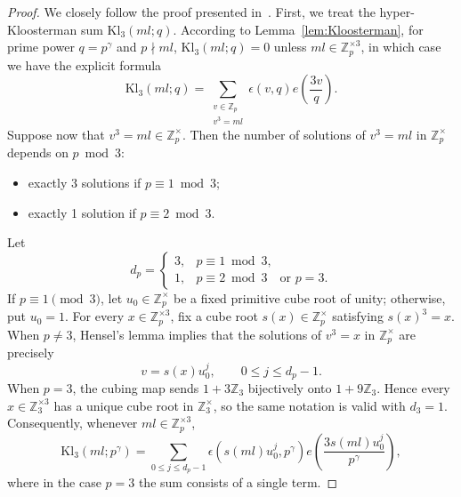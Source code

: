 \documentclass[11pt,reqno]{amsart}
\numberwithin{equation}{section}
\theoremstyle{plain}
\theoremstyle{definition}
\newcommand{\Kl}{\mathrm{Kl}}
\begin{document}
\begin{proof}
We closely follow the proof presented in~\cite[Theorem 6]{MD}.
First, we treat the hyper-Kloosterman sum $\Kl_3(ml;q)$. According to Lemma~\ref{lem:Kloosterman},
for prime power $q = p^\gamma$ and $p \nmid ml$, $\Kl_3(ml;q)=0$ unless $ml\in \mathbb{Z}_p^{\times 3}$, in which case we have the explicit formula
\[
\Kl_3(ml;q) = \sum_{\substack{v \in \mathbb{Z}_p \\ v^3 = ml}} \epsilon(v,q) e\left(\frac{3v}{q}\right).
\]
Suppose now that $v^3=ml \in \mathbb{Z}_p^{\times}$. Then the number of solutions of $v^3=ml$ in $\mathbb{Z}_p^\times$ depends on $p\bmod3$:
\begin{itemize}
\item[-]
exactly 3 solutions if $p\equiv 1 \bmod 3$;
\vskip 2mm
\item[-]
exactly 1 solution if $p\equiv 2 \bmod 3$.
\end{itemize}
Let
$$
d_p=
\begin{cases}
3, & p\equiv1\bmod3,\\
1, & p\equiv2\bmod3\quad \text{or}\,\, p=3.
\end{cases}
$$
If \(p\equiv1\pmod3\), let \(u_0\in\mathbb Z_p^\times\) be a fixed
primitive cube root of unity; otherwise, put \(u_0=1\).
For every \(x\in\mathbb Z_p^{\times3}\), fix a cube root
\(s(x)\in\mathbb Z_p^\times\) satisfying $s(x)^3=x.$
When \(p\neq3\), Hensel's lemma implies that the solutions of
\(v^3=x\) in \(\mathbb Z_p^\times\) are precisely
$$
v=s(x)u_0^j,\qquad 0\le j\le d_p-1.
$$
When \(p=3\), the cubing map sends \(1+3\mathbb Z_3\) bijectively
onto \(1+9\mathbb Z_3\). Hence every
\(x\in\mathbb Z_3^{\times3}\) has a unique cube root in
\(\mathbb Z_3^\times\), so the same notation is valid with \(d_3=1\).
Consequently, whenever \(ml\in\mathbb Z_p^{\times3}\),
$$
\Kl_3(ml;p^\gamma)=\sum_{0\le j\le d_p-1}
\epsilon\left(s(ml)u_0^j,p^\gamma\right)
e\left(\frac{3s(ml)u_0^j}{p^\gamma}\right),
$$
where in the case \(p=3\) the sum consists of a single term.


\end{proof}
\end{document}
